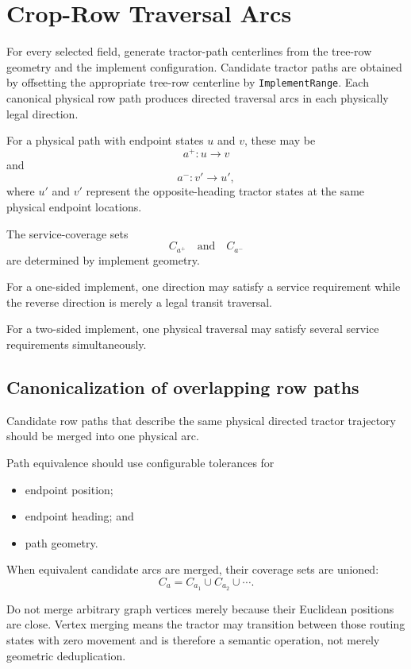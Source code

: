 \documentclass{article}
\begin{document}
\section{Crop-Row Traversal Arcs}

For every selected field, generate tractor-path centerlines from the tree-row geometry and the implement configuration.
Candidate tractor paths are obtained by offsetting the appropriate tree-row centerline by \texttt{ImplementRange}.
Each canonical physical row path produces directed traversal arcs in each physically legal direction.

For a physical path with endpoint states $u$ and $v$, these may be
$$
a^+ : u\rightarrow v
$$
and
$$
a^- : v'\rightarrow u',
$$
where $u'$ and $v'$ represent the opposite-heading tractor states at the same physical endpoint locations.

The service-coverage sets
$$
C_{a^+}
\quad\text{and}\quad
C_{a^-}
$$
are determined by implement geometry.

For a one-sided implement, one direction may satisfy a service requirement while the reverse direction is merely a legal transit traversal.

For a two-sided implement, one physical traversal may satisfy several service requirements simultaneously.

\subsection{Canonicalization of overlapping row paths}

Candidate row paths that describe the same physical directed tractor trajectory should be merged into one physical arc.

Path equivalence should use configurable tolerances for
\begin{itemize}
\item endpoint position;
\item endpoint heading; and
\item path geometry.
\end{itemize}
When equivalent candidate arcs are merged, their coverage sets are unioned:
$$
C_a
=
C_{a_1}\cup C_{a_2}\cup\cdots.
$$

Do not merge arbitrary graph vertices merely because their Euclidean positions are close. Vertex merging means the tractor may transition between those routing states with zero movement and is therefore a semantic operation, not merely geometric deduplication.
\end{document}
